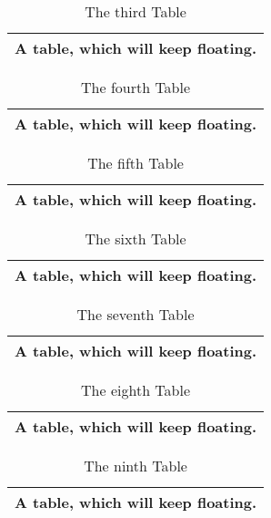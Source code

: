 \documentclass[british]{article}[2007/10/19]%
\begin{document}
\begin{table}[t] \centering%
\begin{tabular}{|l|}
\hline
A table, which will keep floating.\\ \hline
\end{tabular}%
\caption{The third Table}%
\end{table}%

\begin{table}[t] \centering%
\begin{tabular}{|l|}
\hline
A table, which will keep floating.\\ \hline
\end{tabular}%
\caption{The fourth Table}%
\end{table}%

\begin{table}[t] \centering%
\begin{tabular}{|l|}
\hline
A table, which will keep floating.\\ \hline
\end{tabular}%
\caption{The fifth Table}%
\end{table}%

\begin{table}[t] \centering%
\begin{tabular}{|l|}
\hline
A table, which will keep floating.\\ \hline
\end{tabular}%
\caption{The sixth Table}%
\end{table}%

\begin{table}[t] \centering%
\begin{tabular}{|l|}
\hline
A table, which will keep floating.\\ \hline
\end{tabular}%
\caption{The seventh Table}%
\end{table}%

\begin{table}[t] \centering%
\begin{tabular}{|l|}
\hline
A table, which will keep floating.\\ \hline
\end{tabular}%
\caption{The eighth Table}%
\end{table}%

\begin{table}[t] \centering%
\begin{tabular}{|l|}
\hline
A table, which will keep floating.\\ \hline
\end{tabular}%
\caption{The ninth Table}%
\end{table}%
\end{document}
